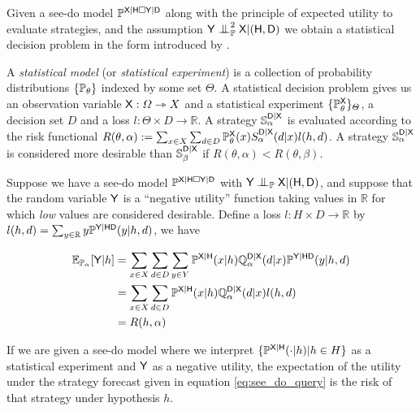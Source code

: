 Given a see-do model $\mathbb{P}^{\mathsf{X}|\mathsf{H}\square \mathsf{Y}|\mathsf{D}}$ along with the principle of expected utility to evaluate strategies, and the assumption $\RV{Y}\CI^2_{\prob{P}} \RV{X}|(\RV{H},\RV{D})$ we obtain a statistical decision problem in the form introduced by \citet{wald_statistical_1950}.

A \emph{statistical model} (or \emph{statistical experiment}) is a collection of probability distributions $\{\mathbb{P}_\theta\}$ indexed by some set $\Theta$. A statistical decision problem gives us an observation variable $\mathsf{X}:\Omega\rightarrowtriangle X$ and a statistical experiment $\{\mathbb{P}^{\mathsf{X}}_\theta\}_\Theta$, a decision set $D$ and a loss $l:\Theta\times D\to \mathbb{R}$. A strategy $\mathbb{S}^{\mathsf{D}|\mathsf{X}}_\alpha$ is evaluated according to the risk functional $R(\theta,\alpha):=\sum_{x\in X}\sum_{d\in D} \mathbb{P}^{\mathsf{X}}_\theta(x) S^{\mathsf{D}|\mathsf{X}}_\alpha (d|x) l(h,d)$. A strategy $\mathbb{S}^{\mathsf{D}|\mathsf{X}}_\alpha$ is considered more desirable than $\mathbb{S}^{\mathsf{D}|\mathsf{X}}_\beta$ if $R(\theta,\alpha)<R(\theta,\beta)$.

Suppose we have a see-do model $\mathbb{P}^{\mathsf{X}|\mathsf{H}\square \mathsf{Y}|\mathsf{D}}$ with $\RV{Y}\CI_{\model{P}} \RV{X}|(\RV{H,D})$, and suppose that the random variable $\mathsf{Y}$ is a ``negative utility'' function taking values in $\mathbb{R}$ for which \emph{low} values are considered desirable. Define a loss $l:H\times D\to \mathbb{R}$ by $l(h,d) = \sum_{y\in \mathbb{R}} y\mathbb{P}^{\mathsf{Y}|\mathsf{H}\mathsf{D}}(y|h,d)$, we have 

\begin{align}
    \mathbb{E}_{\mathbb{P}_{\alpha}}[\mathsf{Y}|h] &= \sum_{x\in X} \sum_{d\in D} \sum_{y\in Y} \mathbb{P}^{\mathsf{X}|\mathsf{H}}(x|h) \mathbb{Q}_\alpha^{\mathsf{D}|\mathsf{X}}(d|x) \mathbb{P}^{\mathsf{Y}|\mathsf{HD}}(y|h,d)\\
    &= \sum_{x\in X} \sum_{d\in D} \mathbb{P}^{\mathsf{X}|\mathsf{H}}(x|h) \mathbb{Q}_\alpha^{\mathsf{D}|\mathsf{X}}(d|x) l(h,d)\\
    &= R(h,\alpha)
\end{align}

If we are given a see-do model where we interpret $\{\mathbb{P}^{\mathsf{X}|\mathsf{H}}(\cdot|h)|h\in H\}$ as a statistical experiment and $\mathsf{Y}$ as a negative utility, the expectation of the utility under the strategy forecast given in equation \ref{eq:see_do_query} is the risk of that strategy under hypothesis $h$.

